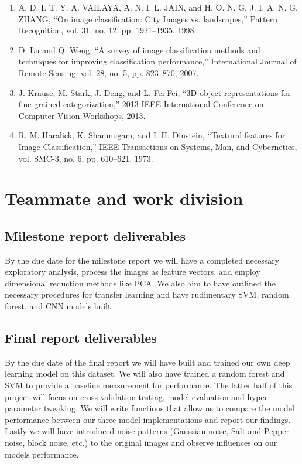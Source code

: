 \documentclass{article}
\begin{document}
\small
\begin{enumerate}
    \item A. D. I. T. Y. A. VAILAYA, A. N. I. L. JAIN, and H. O. N. G. J. I. A. N. G. ZHANG, “On image classification: City Images vs. landscapes,” Pattern Recognition, vol. 31, no. 12, pp. 1921–1935, 1998. \\
    \item D. Lu and Q. Weng, “A survey of image classification methods and techniques for improving classification performance,” International Journal of Remote Sensing, vol. 28, no. 5, pp. 823–870, 2007. \\
    \item J. Krause, M. Stark, J. Deng, and L. Fei-Fei, “3D object representations for fine-grained categorization,” 2013 IEEE International Conference on Computer Vision Workshops, 2013. \\
    \item R. M. Haralick, K. Shanmugam, and I. H. Dinstein, “Textural features for Image Classification,” IEEE Transactions on Systems, Man, and Cybernetics, vol. SMC-3, no. 6, pp. 610–621, 1973. \\
\end{enumerate}



\section{Teammate and work division}
\subsection{Milestone report deliverables}

By the due date for the milestone report we will have a completed necessary exploratory analysis, process the images as feature vectors, and employ dimensional reduction methods like PCA. We also aim to have outlined the necessary procedures for transfer learning and have rudimentary SVM, random forest, and CNN models built.   

\subsection{Final report deliverables}

By the due date of the final report we will have built and trained our own deep learning model on this dataset. We will also have trained a random forest and SVM to provide a baseline measurement for performance.  The latter half of this project will focus on cross validation testing, model evaluation and hyper-parameter tweaking. We will write functions that allow us to compare the model performance between our three model implementations and report our findings. Lastly we will have introduced noise patterns (Gaussian noise, Salt and Pepper noise, block noise, etc.) to the original images and observe influences on our models performance.
\end{document}
